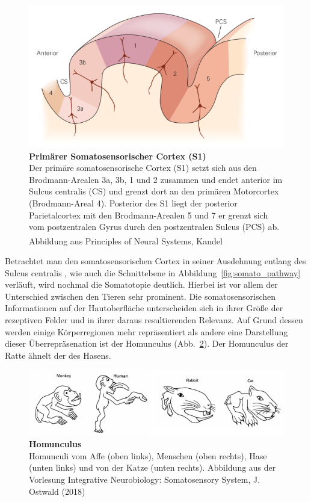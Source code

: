 \documentclass[12pt,a4paper,pdftex]{article}
\begin{document}
\begin{figure}[H]
    \centering
    \includegraphics{pictures/somatosensory/S1_Cortex.png}
    \caption[Primärer Somatosensorischer Cortex]{\textbf{Primärer Somatosensorischer Cortex (S1)}\\
    Der primäre somatosensorische Cortex (S1) setzt sich aus den Brodmann-Arealen 3a, 3b, 1 und 2 zusammen und endet anterior im Sulcus centralis (CS) und grenzt dort an den primären Motorcortex (Brodmann-Areal 4). Posterior des S1 liegt der posterior Parietalcortex mit den Brodmann-Arealen 5 und 7 er grenzt sich vom postzentralen Gyrus durch den postzentralen Sulcus (PCS) ab. Abbildung aus Principles of Neural Systems, Kandel
    \textsuperscript{\cite[23]{kandel2013principles}}}
    \label{fig:S1_Cortex}
\end{figure}

Betrachtet man den somatosensorischen Cortex in seiner Ausdehnung entlang des Sulcus centralis , wie auch die Schnittebene in Abbildung~\ref{fig:somato_pathway} verläuft, wird nochmal die Somatotopie  deutlich. Hierbei ist vor allem der Unterschied zwischen den Tieren sehr prominent. Die somatosensorischen Informationen auf der Hautoberfläche unterscheiden sich in ihrer Größe der rezeptiven Felder und in ihrer daraus resultierenden Relevanz. Auf Grund dessen werden einige Körperregionen mehr repräsentiert als andere eine Darstellung dieser Überrepräsenation ist der Homunculus (Abb.~\ref{fig:somato_homunculus}). Der Homunculus  der Ratte ähnelt der des Hasens.
\\

\begin{figure}[H]
    \centering
    \includegraphics[width = \textwidth] {pictures/somatosensory/homunculus.png}
    \caption[Homunculus]{\textbf{Homunculus}\\
    Homunculi vom Affe (oben links), Menschen (oben rechts), Hase (unten links) und von der Katze (unten rechts). Abbildung aus der Vorlesung Integrative Neurobiology: Somatosensory System, J. Ostwald (2018)}
    \label{fig:somato_homunculus}
\end{figure}
\end{document}
